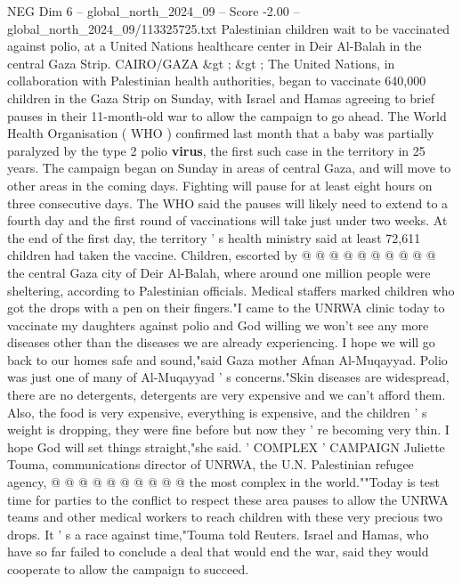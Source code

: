 \begin{textsample}{NEG Dim 6 – global\_north\_2024\_09 – Score -2.00 – global\_north\_2024\_09/113325725.txt}  \label{ex:f6_neg_017}
Palestinian children wait to be vaccinated against polio, at a United Nations healthcare center in Deir Al-Balah in the central Gaza Strip.
CAIRO/GAZA \&gt ; \&gt ; The United Nations, in collaboration with Palestinian health authorities, began to vaccinate 640,000 children in the Gaza Strip on Sunday, with Israel and Hamas agreeing to brief pauses in their 11-month-old war to allow the campaign to go ahead.
The World Health Organisation ( WHO ) confirmed last month that a baby was partially paralyzed by the type 2 polio \textbf{virus}, the first such case in the territory in 25 years.
The campaign began on Sunday in areas of central Gaza, and will move to other areas in the coming days.
Fighting will pause for at least eight hours on three consecutive days.
The WHO said the pauses will likely need to extend to a fourth day and the first round of vaccinations will take just under two weeks.
At the end of the first day, the territory ' s health ministry said at least 72,611 children had taken the vaccine.
Children, escorted by @ @ @ @ @ @ @ @ @ @ the central Gaza city of Deir Al-Balah, where around one million people were sheltering, according to Palestinian officials.
Medical staffers marked children who got the drops with a pen on their fingers."I came to the UNRWA clinic today to vaccinate my daughters against polio and God willing we won't see any more diseases other than the diseases we are already experiencing.
I hope we will go back to our homes safe and sound,"said Gaza mother Afnan Al-Muqayyad.
Polio was just one of many of Al-Muqayyad ' s concerns."Skin diseases are widespread, there are no detergents, detergents are very expensive and we can't afford them.
Also, the food is very expensive, everything is expensive, and the children ' s weight is dropping, they were fine before but now they ' re becoming very thin.
I hope God will set things straight,"she said. ' COMPLEX ' CAMPAIGN Juliette Touma, communications director of UNRWA, the U.N.
Palestinian refugee agency, @ @ @ @ @ @ @ @ @ @ the most complex in the world.""Today is test time for parties to the conflict to respect these area pauses to allow the UNRWA teams and other medical workers to reach children with these very precious two drops.
It ' s a race against time,"Touma told Reuters.
Israel and Hamas, who have so far failed to conclude a deal that would end the war, said they would cooperate to allow the campaign to succeed.

\end{textsample}
